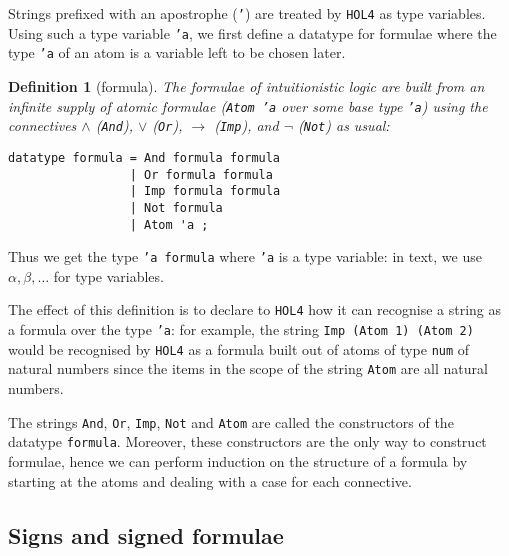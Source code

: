 \documentclass[a4paper]{article}
\newtheorem{definition}{Definition}
\newcommand{\hol}{\texttt{HOL4}}
\begin{document}
Strings prefixed with an apostrophe (\texttt{'}) are treated by
\hol{} as type variables.  Using such a type variable \texttt{'a}, we
first define a datatype for formulae where the type \texttt{'a} of an
atom is a variable left to be chosen later.

\begin{samepage}
\begin{definition}[formula]
 The formulae of intuitionistic logic are built from an infinite
 supply of atomic formulae (\texttt{Atom 'a} over some base type
 \texttt{'a})
 using the connectives
 $\land$ (\texttt{And}),
 $\lor$ (\texttt{Or}),
 $\to$ (\texttt{Imp}), and
 $\lnot$ (\texttt{Not}) as usual:
\begin{verbatim}
datatype formula = And formula formula
                 | Or formula formula
                 | Imp formula formula
                 | Not formula
                 | Atom 'a ;
\end{verbatim}
\end{definition}
\end{samepage}

Thus we get the type \texttt{'a formula} where \texttt{'a} is a type variable:
in text, we use $\alpha, \beta, \ldots$ for type variables.

The effect of this definition is to declare to \hol{} how it can
recognise a string as a formula over the type \texttt{'a}: for
example, the string \texttt{Imp (Atom 1) (Atom 2)} would be recognised
by \hol{} as a formula built out of atoms of type \texttt{num} of
natural numbers since the items in the scope of the string \texttt{Atom}
are all natural numbers.

The strings \texttt{And}, \texttt{Or}, \texttt{Imp}, \texttt{Not} and
\texttt{Atom} are called the constructors of the datatype
\texttt{formula}. Moreover, these constructors are the only way to
construct formulae, hence we can perform induction on the structure of
a formula by starting at the atoms and dealing with a case for each
connective. 

\subsection{Signs and signed formulae}
\end{document}
